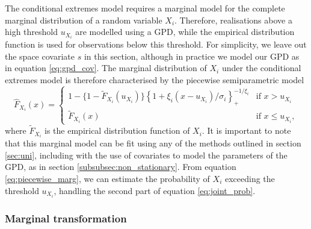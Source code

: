 \documentclass{article}
\numberwithin{equation}{section}
\begin{document}
The conditional extremes model requires a marginal model for the complete marginal distribution of a random variable $X_i$.
Therefore, realisations above a high threshold $u_{X_i}$ are modelled using a GPD, while the empirical distribution function is used for observations below this threshold.
For simplicity, we leave out the space covariate $s$ in this section, although in practice we model our GPD as in equation \ref{eq:gpd_cov}.
The marginal distribution of $X_i$ under the conditional extremes model is therefore characterised by the piecewise semiparametric model
\begin{equation} \label{eq:piecewise_marg}
  \hat{F}_{X_i}(x) = \begin{cases}
    1 - \{ 1 - \tilde{F}_{X_i}(u_{X_i})\} \left\{1 + \xi_{i}(x - u_{X_i})/\sigma_i\right\}_{+}^{-1/\xi_{i}} & \text{if } x > u_{X_i} \\
    \tilde{F}_{X_i}(x) & \text{if } x \le u_{X_i},
  \end{cases}
\end{equation}
where $\tilde{F}_{X_i}$ is the empirical distribution function of $X_i$.
It is important to note that this marginal model can be fit using any of the methods outlined in section \ref{sec:uni}, including with the use of covariates to model the parameters of the GPD, as in section \ref{subsubsec:non_stationary}.
From equation \ref{eq:piecewise_marg}, we can estimate the probability of $X_i$ exceeding the threshold $u_{X_i}$, handling the second part of equation \ref{eq:joint_prob}.

\subsubsection{Marginal transformation}
\end{document}
